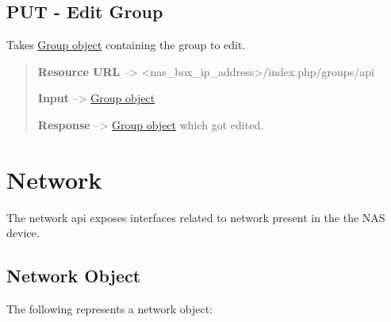 \documentclass[letterpaper,10pt,english]{sphinxmanual}
\begin{document}
\section{PUT - Edit Group}
\label{usersgroups:put-edit-group}
Takes {\hyperref[usersgroups:group-object-label]{Group object}} containing the group to edit.
\begin{quote}

\textbf{Resource URL} --\textgreater{} \textless{}nas\_box\_ip\_address\textgreater{}/index.php/groups/api

\textbf{Input} --\textgreater{} {\hyperref[usersgroups:group-object-label]{Group object}}

\textbf{Response} --\textgreater{} {\hyperref[usersgroups:group-object-label]{Group object}} which got edited.
\end{quote}


\chapter{Network}
\label{network::doc}\label{network:network}\label{network:network-label}
The network api exposes interfaces related to network present in the the NAS device.


\section{Network Object}
\label{network:network-object}\label{network:network-object-label}
The following represents a network object:
\end{document}
